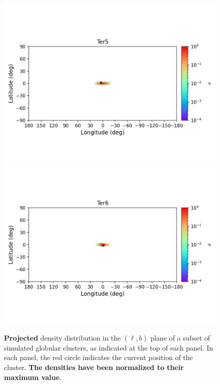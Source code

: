 \begin{figure}
        \includegraphics[clip=true, trim = 0mm 20mm 0mm 10mm, width=1\columnwidth]{images/error_plots_Ter5.png}
        \includegraphics[clip=true, trim = 0mm 20mm 0mm 10mm, width=1\columnwidth]{images/error_plots_Ter6.png}
        \caption[]{\textbf{Projected} density distribution in the $(\ell, b)$ plane of a subset of simulated globular clusters, as indicated at the top of each panel. In each panel, the red circle indicates the current position of the cluster. \textbf{The densities have been normalized to their maximum value}.}\label{stream19}
        \end{figure}
